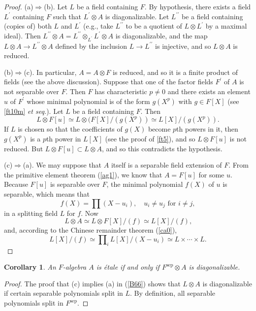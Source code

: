 \documentclass[a4paper,11pt,final,openany]{memoir}
\newtheorem{corollary}[X]{Corollary}
\theoremstyle{nonumberplain}
\newtheorem{proof}{Proof.}
\begin{document}
\begin{proof}
(a)$\Rightarrow$(b). Let $L$ be a field containing $F$. By hypothesis, there
exists a field $L^{\prime}$ containing $F$ such that $L^{\prime}\otimes A$ is
diagonalizable. Let $L^{\prime\prime}$ be a field containing (copies of) both
$L$ and $L^{\prime}$ (e.g., take $L^{\prime\prime}$ to be a quotient of
$L\otimes L^{\prime}$ by a maximal ideal). Then $L^{\prime\prime}\otimes
A=L^{\prime\prime}\otimes_{L^{\prime}}L^{\prime}\otimes A$ is diagonalizable,
and the map $L\otimes A\rightarrow L^{\prime\prime}\otimes A$ defined by the
inclusion $L\rightarrow L^{\prime\prime}$ is injective, and so $L\otimes A$ is reduced.

(b)$\Rightarrow$(c). In particular, $A=A\otimes F$ is reduced, and so it is a
finite product of fields (see the above discussion). Suppose that one of the
factor fields $F^{\prime}$ of $A$ is not separable over $F$. Then $F$ has
characteristic $p\neq0$ and there exists an element $u$ of $F^{\prime}$ whose
minimal polynomial is of the form $g(X^{p})$ with $g\in F[X]$ (see \ref{ft10m}
\textit{et seq.}). Let $L$ be a field containing $F$. Then%
\[
L\otimes F[u]\simeq L\otimes(F[X]/(g(X^{p}))\simeq L[X]/(g(X^{p}))\text{.}%
\]
If $L$ is chosen so that the coefficients of $g(X)$ become $p$th powers in it,
then $g(X^{p})$ is a $p$th power in $L[X]$ (see the proof of \ref{ft5}), and
so $L\otimes F[u]$ is not reduced. But $L\otimes F[u]\subset L\otimes A$, and
so this contradicts the hypothesis.

(c)$\Rightarrow$(a). We may suppose that $A$ itself is a separable field
extension of $F$. From the primitive element theorem (\ref{ag1}), we know that
$A=F[u]$ for some $u$. Because $F[u]$ is separable over $F$, the minimal
polynomial $f(X)$ of $u$ is separable, which means that
\[
f(X)=\prod(X-u_{i}),\quad u_{i}\neq u_{j}\text{ for }i\neq j,
\]
in a splitting field $L$ for $f$. Now%
\[
L\otimes A\simeq L\otimes F[X]/(f)\simeq L[X]/(f)\text{,}%
\]
and, according to the Chinese remainder theorem (\ref{ca0}),%
\[
L[X]/(f)\simeq\prod\nolimits_{i}L[X]/(X-u_{i})\simeq L\times\cdots\times
L\text{.}%
\]

\end{proof}

\begin{corollary}
\label{B67}An $F$-algebra $A$ is \'{e}tale if and only if $F^{\mathrm{sep}%
}\otimes A$ is diagonalizable.
\end{corollary}

\begin{proof}
The proof that (c) implies (a) in (\ref{B66}) shows that $L\otimes A$ is
diagonalizable if certain separable polynomials split in $L$. By definition,
all separable polynomials split in $F^{\mathrm{sep}}$.
\end{proof}
\end{document}

